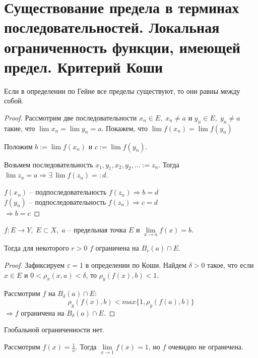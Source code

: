 \section{Существование предела в терминах последовательностей. Локальная ограниченность функции, имеющей предел. Критерий Коши \href{https://youtu.be/BiTNBigkkyU?t=2205}{\Walley}}

\begin{theorem-non}
    Если в определении по Гейне все пределы существуют, то они равны между собой. 
\end{theorem-non}
\begin{proof}
    Рассмотрим две последовательности $x_n \in E, \; x_n \neq a$ и $y_n \in E, \; y_n \neq a$ такие, что $\lim x_n = \lim y_n = a$. Покажем, что $\lim f(x_n) = \lim f(y_n)$
    
    Положим $b := \lim f(x_n)$ и $c := \lim f(y_n)$.

    Возьмем последовательность $x_1, y_1, x_2, y_2, \dots := z_n$. Тогда $\lim z_n = a \Rightarrow \exists \, \lim f(z_n) =: d$.
    
    $f(x_n)$ -- подпоследовательность $f(z_n) \Rightarrow b = d$ \\
    $f(y_n)$ -- подпоследовательность $f(z_n) \Rightarrow c = d$ \\
    $\Rightarrow b = c$
\end{proof}

\begin{theorem-non}
    $f : E \to Y, \; E \subset X, \; a$ -- предельная точка $E$ и $\lim\limits_{x \to a} f(x) = b$. 

    Тогда для некоторого $r > 0$ $f$ ограничена на $B_r(a) \cap E$. 
\end{theorem-non}
\begin{proof}
    Зафиксируем $\varepsilon = 1$ в определении по Коши. Найдем $\delta > 0$ такое, что если $x \in E$ и $0 < \rho_x(x, a) < \delta$, то $\rho_y(f(x), b) < 1$.

    Рассмотрим $f$ на $B_{\delta}(a) \cap E$:
    \[ \rho_y(f(x), b) < max \{1, \rho_y(f(a), b)\} \]
    $\Rightarrow f$ ограничена на $B_{\delta}(a) \cap E$.
\end{proof}
\begin{notice}
    Глобальной ограниченности нет. 

    Рассмотрим $f(x) = \frac{1}{x}$. Тогда $\lim\limits_{x \to 1} f(x) = 1$, но $f$ очевидно не огранечена.
\end{notice}

\vspace{7mm}

